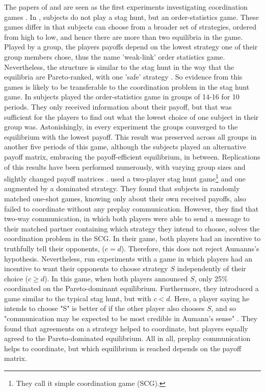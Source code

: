 The papers of \textcite{van_huyck_tacit_1990} and 
\textcite{cooper_communication_1992} are seen as the first experiments 
investigating coordination games \parencite{devetag_when_2007}.
In \textcite{van_huyck_tacit_1990}, subjects do not play a stag
hunt, but an order-statistics game. These games differ in that subjects can
choose from a broader set of strategies, ordered from high to low, and 
hence there are more than two equilibria in the game. 
Played by a group, the players payoffs depend on the lowest strategy one of 
their group members chose, thus the name 'weak-link' order statistics game. 
Nevertheless, the structure is similar to the stag hunt in the way 
that the equilibria are Pareto-ranked, with one 
'safe' strategy \parencite{devetag_when_2007}.
So evidence from this games is likely to be transferable to the 
coordination problem in the stag hunt game. 
In \textcite{van_huyck_tacit_1990} subjects played the order-statistics 
game in 
groups of 14-16 for 10 periods. They only received information about their 
payoff, but that was sufficient for the players to find out what the 
lowest choice of one subject in 
their group was. Astonishingly, in every experiment the groups converged
to the equilibrium with the lowest payoff. 
This result was preserved across all groups in another 
five periods of this game, although the subjects played an alternative payoff
matrix, embracing the payoff-efficient equilibrium, in between. 
Replications of this results have been performed numerously, with 
varying group sizes and slightly changed payoff matrices 
\parencite[6]{devetag_when_2007}. 
\textcite{cooper_communication_1992} used a
two-player stag hunt game\footnote{They call 
it simple coordination game (SCG).}  
and one augmented by a dominated strategy. They found that 
subjects in randomly matched one-shot games, knowing only about their own
received payoffs, also failed to coordinate without any preplay communication. 
However, they find that two-way communication, in which both players were
able to send a message to their matched partner containing which strategy
they intend to choose, solves the coordination problem in the SCG. 
In their game, both players had an incentive to truthfully tell their
opponents, ($c=d$). Therefore, this does not reject Aumanns's hypothesis.
Nevertheless, \textcite{clark_when_2001} run experiments with a game in which
players had an incentive to want their opponents to choose strategy $S$ 
independently of their choice ($c \geq d$).
In this game, when both players announced $S$, only 25\% coordinated on
the Pareto-dominant equilibrium. Furthermore, they introduced a game
similar to the typical stag hunt, but with $c<d$. Here, a player saying he 
intends to choose "S" is better of if the other player also chooses $S$, and
so "communication may be expected to be most credible in Aumann's sense" 
\parencite[508]{clark_when_2001}. They found that agreements on a strategy
helped to coordinate, but players equally agreed to the Pareto-dominated
equilibrium. 
All in all, preplay communication helps to coordinate, but which
equilibrium is reached depends on the payoff matrix.


